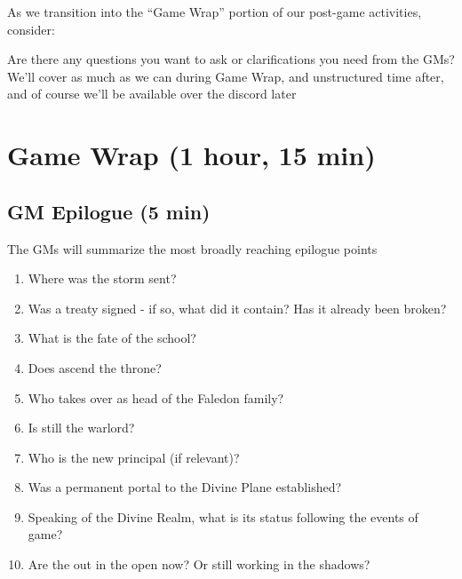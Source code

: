\documentclass[green]{GL2020}
\begin{document}
As we transition into the “Game Wrap” portion of our post-game activities, consider: 

Are there any questions you want to ask or clarifications you need from the GMs? We’ll cover as much as we can during Game Wrap, and unstructured time after, and of course we’ll be available over the discord later


\section*{Game Wrap (1 hour, 15 min)}

\subsection*{GM Epilogue (5 min)}
The GMs will summarize the most broadly reaching epilogue points
\begin{enumerate}
	\item Where was the storm sent?
	\item Was a treaty signed - if so, what did it contain? Has it already been broken?
	\item What is the fate of the school?
	\item Does \cPrince{} ascend the throne?
	\item Who takes over as head of the Faledon family?
	\item Is \cLoud{} still the warlord?
	\item Who is the new principal (if relevant)?
	\item Was a permanent portal to the Divine Plane established? 
\item Speaking of the Divine Realm, what is its status following the events of game?
	\item Are the \pGoaties{} out in the open now? Or still working in the shadows?
\end{enumerate}
\end{document}

